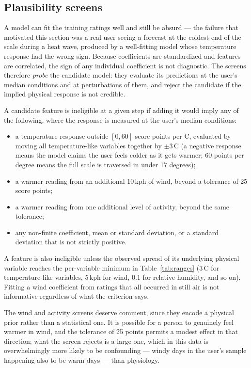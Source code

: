 \documentclass[11pt]{article}
\begin{document}
\subsection{Plausibility screens}
\label{sec:plausibility}

A model can fit the training ratings well and still be absurd --- the failure
that motivated this section was a real user seeing a forecast at the coldest
end of the scale during a heat wave, produced by a well-fitting model whose
temperature response had the wrong sign. Because coefficients are standardized
and features are correlated, the sign of any individual coefficient is not
diagnostic. The screens therefore \emph{probe} the candidate model: they
evaluate its predictions at the user's median conditions and at perturbations
of them, and reject the candidate if the implied physical response is not
credible.

A candidate feature is ineligible at a given step if adding it would imply any
of the following, where the response is measured at the user's median
conditions:

\begin{itemize}
\item a temperature response outside $[0, 60]$ score points per
      \textdegree C, evaluated by moving all temperature-like variables
      together by $\pm 3$\,\textdegree C (a negative response means the model
      claims the user feels colder as it gets warmer; 60 points per degree
      means the full scale is traversed in under 17 degrees);
\item a warmer reading from an additional 10\,kph of wind, beyond a tolerance
      of 25 score points;
\item a warmer reading from one additional level of activity, beyond the same
      tolerance;
\item any non-finite coefficient, mean or standard deviation, or a
      standard deviation that is not strictly positive.
\end{itemize}

A feature is also ineligible unless the observed spread of its underlying
physical variable reaches the per-variable minimum in Table~\ref{tab:ranges}
(3\,\textdegree C for temperature-like variables, 5\,kph for wind, 0.1 for
relative humidity, and so on).
Fitting a wind coefficient from ratings that all occurred in still air is not
informative regardless of what the criterion says.

The wind and activity screens deserve comment, since they encode a physical
prior rather than a statistical one. It is possible for a person to genuinely
feel warmer in wind, and the tolerance of 25 points permits a modest effect in
that direction; what the screen rejects is a large one, which in this data is
overwhelmingly more likely to be confounding --- windy days in the user's
sample happening also to be warm days --- than physiology.
\end{document}

